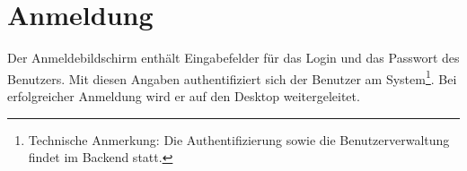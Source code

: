 %


\chapter{Anmeldung}

Der Anmeldebildschirm enthält Eingabefelder für das Login und das Passwort des
Benutzers. Mit diesen Angaben authentifiziert sich der Benutzer am
System\footnote{Technische Anmerkung: Die Authentifizierung sowie die
Benutzerverwaltung findet im Backend statt.}. Bei erfolgreicher Anmeldung wird
er auf den Desktop weitergeleitet. 
